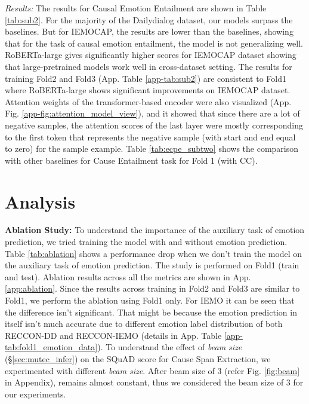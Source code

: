 \documentclass{article}
\begin{document}
\noindent\textit{Results:} The results for Causal Emotion Entailment are shown in Table \ref{tab:sub2}. For the majority of the Dailydialog dataset, our models surpass the baselines. But for IEMOCAP, the results are lower than the baselines, showing that for the task of causal emotion entailment, the model is not generalizing well. RoBERTa-large gives significantly higher scores for IEMOCAP dataset showing that large-pretrained models work well in cross-dataset setting. The results for training Fold2 and Fold3 (App. Table \ref{app-tab:sub2}) are consistent to Fold1 where RoBERTa-large shows significant improvements on IEMOCAP dataset. Attention weights of the transformer-based encoder were also visualized (App. Fig. \ref{app-fig:attention_model_view}), and it showed that since there are a lot of negative samples, the attention scores of the last layer were mostly corresponding to the first token that represents the negative sample (with start and end equal to zero) for the sample example. Table \ref{tab:ecpe_subtwo} shows the comparison with other baselines for Cause Entailment task for Fold 1 (with CC). \section{Analysis} \label{sec:analysis}
\vspace{-3mm}
\noindent\textbf{Ablation Study:} To understand the importance of the auxiliary task of emotion prediction, we tried training the model with and without emotion prediction. Table \ref{tab:ablation} shows a performance drop when we don't train the model on the auxiliary task of emotion prediction. The study is performed on Fold1 (train and test). Ablation results across all the metrics are shown in App. \ref{app:ablation}. Since the results across training in Fold2 and Fold3 are similar to Fold1, we perform the ablation using Fold1 only. For IEMO it can be seen that the difference isn't significant. That might be because the emotion prediction in itself isn't much accurate due to different emotion label distribution of both RECCON-DD and RECCON-IEMO (details in App. Table \ref{app-tab:fold1_emotion_data}).
To understand the effect of \textit{beam size} (\S \ref{sec:mutec_infer}) on the SQuAD  score for Cause Span Extraction, we experimented with different \textit{beam size}. After beam size of 3 (refer Fig. \ref{fig:beam} in Appendix),  remains almost constant, thus we considered the beam size of 3 for our experiments. 
\end{document}
